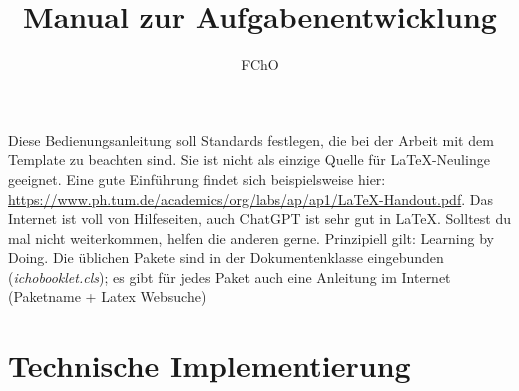 \documentclass[./main.tex]{subfiles}
\title{Manual zur Aufgabenentwicklung}
\author{FChO}
\begin{document}
\maketitle
Diese Bedienungsanleitung soll Standards festlegen, die bei der Arbeit mit dem Template zu beachten sind. Sie ist nicht als einzige Quelle f\"ur \LaTeX-Neulinge geeignet. Eine gute Einf\"uhrung findet sich beispielsweise hier: \url{https://www.ph.tum.de/academics/org/labs/ap/ap1/LaTeX-Handout.pdf}. Das Internet ist voll von Hilfeseiten, auch ChatGPT ist sehr gut in \LaTeX. Solltest du mal nicht weiterkommen, helfen die anderen gerne. Prinzipiell gilt: Learning by Doing. Die \"ublichen Pakete sind in der Dokumentenklasse eingebunden (\textit{ichobooklet.cls}); es gibt f\"ur jedes Paket auch eine Anleitung im Internet (Paketname + Latex Websuche)
\tableofcontents
\pagebreak

\section{Technische Implementierung}
\end{document}

